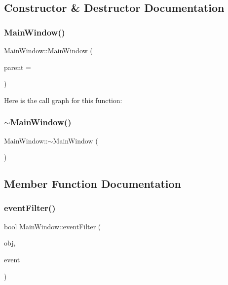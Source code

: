 \subsection{Constructor \& Destructor Documentation}
\mbox{\label{class_main_window_a8b244be8b7b7db1b08de2a2acb9409db}} 
\subsubsection{\texorpdfstring{Main\+Window()}{MainWindow()}}
{\footnotesize\ttfamily Main\+Window\+::\+Main\+Window (\begin{DoxyParamCaption}\item[{Q\+Widget $\ast$}]{parent = {} }\end{DoxyParamCaption})\hspace{0.3cm}{\ttfamily [explicit]}}

Here is the call graph for this function\+:
\mbox{\label{class_main_window_ae98d00a93bc118200eeef9f9bba1dba7}} 
\subsubsection{\texorpdfstring{$\sim$\+Main\+Window()}{~MainWindow()}}
{\footnotesize\ttfamily Main\+Window\+::$\sim$\+Main\+Window (\begin{DoxyParamCaption}{ }\end{DoxyParamCaption})}



\subsection{Member Function Documentation}
\mbox{\label{class_main_window_aa0916a59a9d7ee37159ed0a2e0528960}} 
\subsubsection{\texorpdfstring{event\+Filter()}{eventFilter()}}
{\footnotesize\ttfamily bool Main\+Window\+::event\+Filter (\begin{DoxyParamCaption}\item[{Q\+Object $\ast$}]{obj,  }\item[{Q\+Event $\ast$}]{event }\end{DoxyParamCaption})\hspace{0.3cm}{\ttfamily [protected]}}



